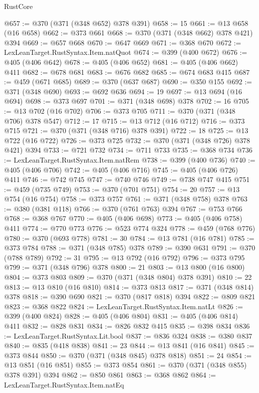 \begin{lexlean}{RustCore}
\begin{coremodule}
@657 := @370 (@371 (@348 @652) @378 @391)
@658 := 15
@661 := @13 @658 (@16 @658)
@662 := @373 @661
@668 := @370 (@371 (@348 @662) @378 @421) @394
@669 := @657 @668
@670 := @647 @669
@671 := @368 @670
@672 := LexLeanTarget.RustSyntax.Item.natQuot
@674 := @399 (@400 @672)
@676 := @405 (@406 @642)
@678 := @405 (@406 @652)
@681 := @405 (@406 @662) @411
@682 := @678 @681
@683 := @676 @682
@685 := @674 @683 @415
@687 := @459 (@671 @685)
@689 := @370 (@637 @687)
@690 := @350 @155
@692 := @371 (@348 @690)
@693 := @692 @636
@694 := 19
@697 := @13 @694 (@16 @694)
@698 := @373 @697
@701 := @371 (@348 @698) @378
@702 := 16
@705 := @13 @702 (@16 @702)
@706 := @373 @705
@711 := @370 (@371 (@348 @706) @378 @547)
@712 := 17
@715 := @13 @712 (@16 @712)
@716 := @373 @715
@721 := @370 (@371 (@348 @716) @378 @391)
@722 := 18
@725 := @13 @722 (@16 @722)
@726 := @373 @725
@732 := @370 (@371 (@348 @726) @378 @421) @394
@733 := @721 @732
@734 := @711 @733
@735 := @368 @734
@736 := LexLeanTarget.RustSyntax.Item.natRem
@738 := @399 (@400 @736)
@740 := @405 (@406 @706)
@742 := @405 (@406 @716)
@745 := @405 (@406 @726) @411
@746 := @742 @745
@747 := @740 @746
@749 := @738 @747 @415
@751 := @459 (@735 @749)
@753 := @370 (@701 @751)
@754 := 20
@757 := @13 @754 (@16 @754)
@758 := @373 @757
@761 := @371 (@348 @758) @378
@763 := @380 (@381 @118)
@766 := @370 (@761 @763) @394
@767 := @753 @766
@768 := @368 @767
@770 := @405 (@406 @698)
@773 := @405 (@406 @758) @411
@774 := @770 @773
@776 := @523 @774 @324
@778 := @459 (@768 @776)
@780 := @370 (@693 @778)
@781 := 30
@784 := @13 @781 (@16 @781)
@785 := @373 @784
@788 := @371 (@348 @785) @378
@789 := @390 @631
@791 := @370 (@788 @789)
@792 := 31
@795 := @13 @792 (@16 @792)
@796 := @373 @795
@799 := @371 (@348 @796) @378
@800 := 21
@803 := @13 @800 (@16 @800)
@804 := @373 @803
@809 := @370 (@371 (@348 @804) @378 @391)
@810 := 22
@813 := @13 @810 (@16 @810)
@814 := @373 @813
@817 := @371 (@348 @814) @378
@818 := @390 @690
@821 := @370 (@817 @818) @394
@822 := @809 @821
@823 := @368 @822
@824 := LexLeanTarget.RustSyntax.Item.natLt
@826 := @399 (@400 @824)
@828 := @405 (@406 @804)
@831 := @405 (@406 @814) @411
@832 := @828 @831
@834 := @826 @832 @415
@835 := @398 @834
@836 := LexLeanTarget.RustSyntax.Lit.bool
@837 := @836 @324
@838 := @380 @837
@840 := @835 (@418 @838)
@841 := 23
@844 := @13 @841 (@16 @841)
@845 := @373 @844
@850 := @370 (@371 (@348 @845) @378 @818)
@851 := 24
@854 := @13 @851 (@16 @851)
@855 := @373 @854
@861 := @370 (@371 (@348 @855) @378 @391) @394
@862 := @850 @861
@863 := @368 @862
@864 := LexLeanTarget.RustSyntax.Item.natEq

\end{coremodule}
\end{lexlean}
